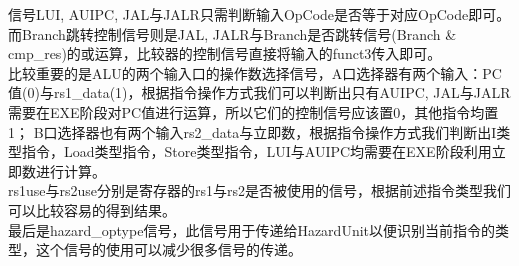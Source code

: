 信号LUI, AUIPC, JAL与JALR只需判断输入OpCode是否等于对应OpCode即可。而Branch跳转控制信号则是JAL, JALR与Branch是否跳转信号(Branch \& cmp\_res)的或运算，比较器的控制信号直接将输入的funct3传入即可。 \\
比较重要的是ALU的两个输入口的操作数选择信号，A口选择器有两个输入：PC值(0)与rs1\_data(1)，根据指令操作方式我们可以判断出只有AUIPC, JAL与JALR需要在EXE阶段对PC值进行运算，所以它们的控制信号应该置0，其他指令均置1；
B口选择器也有两个输入rs2\_data与立即数，根据指令操作方式我们判断出I类型指令，Load类型指令，Store类型指令，LUI与AUIPC均需要在EXE阶段利用立即数进行计算。 \\
rs1use与rs2use分别是寄存器的rs1与rs2是否被使用的信号，根据前述指令类型我们可以比较容易的得到结果。 \\
最后是hazard\_optype信号，此信号用于传递给HazardUnit以便识别当前指令的类型，这个信号的使用可以减少很多信号的传递。

